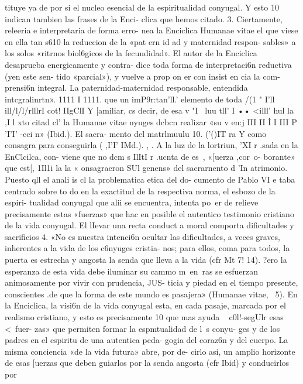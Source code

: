 \documentclass[letterpaper]{report}
\begin{document}
tituye ya de por si el nucleo esencial de la espiritualidad 
conyugal. Y esto 10 indican tambien las frases de la Enci- 
clica que hemos citado. 
3. Ciertamente, releeria e interpretaria de forma erro- 
nea la Enciclica Humanae vitae el que viese en ella tan 
s610 la reduccion de la «pat ern id ad y maternidad respon- 
sables» a los solos «ritrnos biol6gicos de la fecundidad». El 
autor de la Enciclica desaprueba energicamente y contra- 
dice toda forma de interpretaci6n reductiva (yen este sen- 
tido «parcial»), y vuelve a prop on er con insist en cia la com- 
prensi6n integral. La paternidad-maternidad responsable, 
entendida intcgralinrtn». 1111 I 1111. que un imP9r:tan'll.' 
elemento de toda /(1 " I'll ill/l/l/rlllrI cot! IIgClI Y [amiliar, cs 
decir, de esa v "I~ luu tll' I •• <illl' hul la ,I l xto citad cl' 
la Humanae vitae nyuges dcbcn 
realizar «su v en:j III II \. I I III P 'I'I' -cci n» (Ibid.). El sacra- 
mento del matrlmuulu 10. ('()IT 	ra Y como consagra 
para conseguirla ( ,I'I' IMd.). 	, . 
A la luz de la lortriun, 'XI r .sada en la EnClcilca, con- 
viene que no dcm s IlItI r .ucnta de es~, «[uerza ,cor~o- 
borante» que est[, 1Il1i la la « onsagracron SUl genens» 
del sacrarnento d 'In atrimonio. 
Puesto qll el anali is cl la problematica etica del do- 
cumento de Pablo VI e taba centrado sobre to do en la 
exactitud de la respectiva norma, el esbozo de la espiri- 
tualidad conyugal que alii se encuentra, intenta po~er de 
relieve precisamente estas «fuerzas» que hac en posible el 
autentico testimonio cristiano de la vida conyugal. 
El lIevar una recta conduct a moral 
comporta dificultades y sacrificios 
4. «No es nuestra intenci6n ocultar las dificultades, a 
veces graves, inherentes a la vida de los c6nyuges cristia- 
nos; para ellos, coma para todos, la puerta es estrecha y 
angosta la senda que lleva a la vida (cfr Mt 7! 14). ?ero la 
esperanza de esta vida debe iluminar su cammo m~en~ras 
se esfuerzan animosamente por vivir con prudencia, JUS- 
ticia y piedad en el tiempo presente, conscientes .de que la 
forma de este mundo es pasajera» (Humanae vitae, ~5). 
En la Enciclica, la visi6n de la vida conyugal esta, en 
cada pasaje, marcada por el realismo cristiano, y esto es 
precisamente 10 que mas ayuda ~ c0l!-segUlr esas <~fuer- 
zas» que permiten formar la espmtualidad de l~s conyu- 
ges y de los padres en el espiritu de una autentica peda- 
gogia del coraz6n y del cuerpo. 
La misma conciencia «de la vida futura» abre, por de- 
cirlo asi, un amplio horizonte de esas [uerzas que deben 
guiarlos por la senda angosta (cfr Ibid) y conducirlos por 
\end{document}
